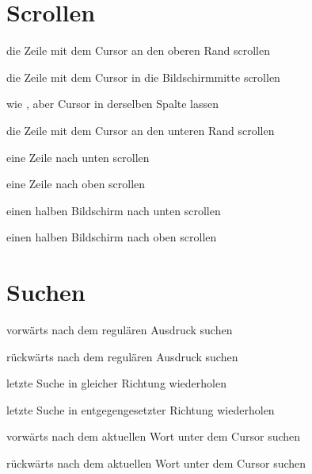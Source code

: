 \documentclass
[
  draft    = true,
  fontsize = 11pt,
  parskip  = half,
  BCOR     = 0pt,
  DIV      = calc,
  ngerman
]
{scrartcl}
\begin{document}
\section{Scrollen}
\begin{mytemize}
  \renewcommand{\cmdwidth}{5em}%
  \item {} die Zeile mit dem Cursor an den oberen Rand scrollen
  \item {}        die Zeile mit dem Cursor in die Bildschirmmitte scrollen
  \item {}        wie , aber Cursor in derselben Spalte lassen
  \item {}        die Zeile mit dem Cursor an den unteren Rand scrollen
  \item {}       eine Zeile nach unten scrollen
  \item {}       eine Zeile nach oben scrollen
  \item {}       einen halben Bildschirm nach unten scrollen
  \item {}       einen halben Bildschirm nach oben scrollen
\end{mytemize}

\section{Suchen}
\begin{mytemize}
  \item {} vorwärts nach dem regulären Ausdruck  suchen
  \item {} rückwärts nach dem regulären Ausdruck  suchen
  \item {}  letzte Suche in gleicher Richtung wiederholen
  \item {}  letzte Suche in entgegengesetzter Richtung wiederholen
  \item \vimcmd{}{*}{}  vorwärts nach dem aktuellen Wort unter dem Cursor suchen
  \item \vimcmd{}{\#}{} rückwärts nach dem aktuellen Wort unter dem Cursor suchen
\end{mytemize}

\end{document}
